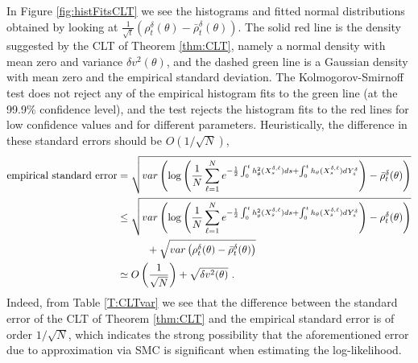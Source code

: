 \documentclass{article}
\begin{document}
In Figure \ref{fig:histFitsCLT} we see the histograms and fitted normal distributions obtained by looking at $\frac{1}{\sqrt t}\left(\rho_t^\delta(\theta)-\bar\rho_t^\delta(\theta)\right)$.
The solid red line is the density suggested by the CLT of Theorem \ref{thm:CLT}, namely a normal density with mean zero and variance $\delta v^{2}(\theta)$, and the dashed green line is a Gaussian density with mean zero and the empirical standard deviation. The Kolmogorov-Smirnoff test does not reject any of the empirical histogram fits to the green line (at the 99.9\%  confidence level), and the test rejects the histogram fits to the red lines for low confidence values and for different parameters. Heuristically, the difference in these standard errors should be $O(1/\sqrt N)$, \begin{align*}
\hbox{empirical standard error}&=\sqrt{var\left(\log\left(\frac 1N \sum_{\ell=1}^Ne^{-\frac 12\int_0^th_{\theta}^2(X_s^{\delta,\ell})ds+\int_0^th_{\theta}(X_s^{\delta,\ell})dY_s^\delta}\right)-\bar \rho_t^\delta(\theta)\right)}\\
&\leq \sqrt{var\left(\log\left(\frac 1N \sum_{\ell=1}^Ne^{-\frac 12\int_0^th_{\theta}^2(X_s^{\delta,\ell})ds+\int_0^th_{\theta}(X_s^{\delta,\ell})dY_s^\delta}\right)-\rho_t^\delta(\theta)\right)}\\
&\hspace{1cm}+\sqrt{var\left(\rho_t^\delta(\theta)-\bar\rho_t^\delta(\theta)\right)}\\
&\simeq O\left(\frac{1}{\sqrt N}\right)+\sqrt{\delta v^2(\theta)}\ .
\end{align*}
Indeed, from Table \ref{T:CLTvar} we see that the difference between the standard error of the CLT of Theorem \ref{thm:CLT} and the empirical standard error is of order $1/\sqrt N$, which indicates the strong possibility that the aforementioned error due to approximation via SMC is significant when estimating the log-likelihood.
\end{document}
